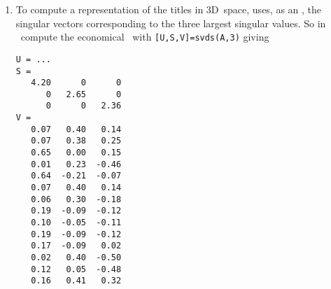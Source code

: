 \begin{enumerate}
\item To compute a representation of the titles in 3D~space,  uses, as an , the singular vectors corresponding to the three largest singular values.
So in \script\ compute the economical \svd\ with \verb|[U,S,V]=svds(A,3)| giving \twodp
\begin{verbatim}
U = ...
S =
   4.20      0      0
      0   2.65      0
      0      0   2.36
V =
   0.07   0.40   0.14
   0.07   0.38   0.25
   0.65   0.00   0.15
   0.01   0.23  -0.46
   0.64  -0.21  -0.07
   0.07   0.40   0.14
   0.06   0.30  -0.18
   0.19  -0.09  -0.12
   0.10  -0.05  -0.11
   0.19  -0.09  -0.12
   0.17  -0.09   0.02
   0.02   0.40  -0.50
   0.12   0.05  -0.48
   0.16   0.41   0.32
\end{verbatim}


\end{enumerate}
